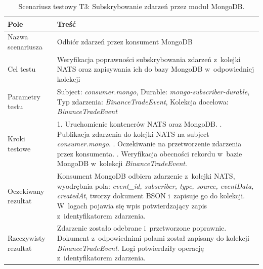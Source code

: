 \begin{table}[H]
    \centering
    \caption{Scenariusz testowy T3: Subskrybowanie zdarzeń przez moduł MongoDB.}
    \label{tab:test_mongo_subscribe}
    \begin{tabular}{|p{}|p{}|}
        \hline
        \textbf{Pole}        & \textbf{Treść}                                                                                                                                                                                                                                                                                           \\ \hline
        Nazwa scenariusza    & Odbiór zdarzeń przez konsument MongoDB                                                                                                                                                                                                                                                                   \\ \hline
        Cel testu            & Weryfikacja poprawności subskrybowania zdarzeń z~kolejki NATS oraz zapisywania ich do bazy MongoDB w~odpowiedniej kolekcji                                                                                                                                                                               \\ \hline
        Parametry testu      & Subject: \textit{consumer.mongo}, Durable: \textit{mongo-subscriber-durable}, Typ zdarzenia: \textit{BinanceTradeEvent}, Kolekcja docelowa: \textit{BinanceTradeEvent}                                                                                                                                   \\ \hline
        Kroki testowe        & 1. Uruchomienie kontenerów NATS oraz MongoDB. \newline 2. Publikacja zdarzenia do kolejki NATS na subject \textit{consumer.mongo}. \newline 3. Oczekiwanie na przetworzenie zdarzenia przez konsumenta. \newline 4. Weryfikacja obecności rekordu w~bazie MongoDB w~kolekcji \textit{BinanceTradeEvent}. \\ \hline
        Oczekiwany rezultat  & Konsument MongoDB odbiera zdarzenie z~kolejki NATS, wyodrębnia pola: \textit{event\_id, subscriber, type, source, eventData, createdAt}, tworzy dokument BSON i~zapisuje go do kolekcji. W~logach pojawia się wpis potwierdzający zapis z~identyfikatorem zdarzenia.                                     \\ \hline
        Rzeczywisty rezultat & Zdarzenie zostało odebrane i~przetworzone poprawnie. Dokument z~odpowiednimi polami został zapisany do kolekcji \textit{BinanceTradeEvent}. Logi potwierdziły operację z~identyfikatorem zdarzenia.                                                                                                      \\ \hline
    \end{tabular}
\end{table}

